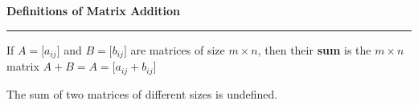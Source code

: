 \nopagenumbers
{\bf Definitions of Matrix Addition}
\vskip 1mm
\hrule

\vskip 6pt
If $A=\lbrack a_{ij}\rbrack$ and $B=\lbrack b_{ij}\rbrack$ are matrices of size $m\times n$, then their {\bf sum} is the $m\times n$ matrix $A+B=A=\lbrack a_{ij}+b_{ij}\rbrack$

\vskip 6pt
The sum of two matrices of different sizes is undefined.


\vfill\eject
\bye
